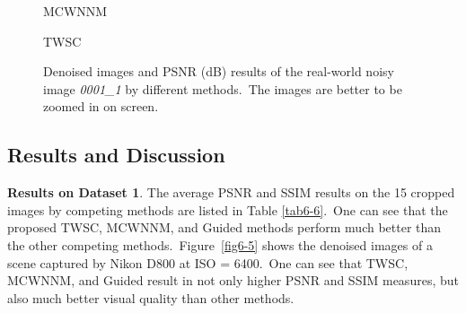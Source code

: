 \begin{figure}
{\begin{minipage}[t]{0.19\textwidth}
{\scriptsize MCWNNM}
\end{minipage}
\begin{minipage}[t]{0.19\textwidth}
\centering
{}
{\footnotesize TWSC}
\end{minipage}
}
    \caption{Denoised images and PSNR (dB) results of the real-world noisy image \textsl{0001\_1} \cite{dnd2017} by different methods.\ The images are better to be zoomed in on screen.}
    \label{fig6-6}
\end{figure}


\subsection{Results and Discussion}

\textbf{Results on Dataset 1}. The average PSNR and SSIM results on the 15 cropped images by competing methods are listed in Table \ref{tab6-6}.\ One can see that the proposed TWSC, MCWNNM, and Guided methods perform much better than the other competing methods.\ Figure\ \ref{fig6-5} shows the denoised images of a scene captured by Nikon D800 at ISO = 6400.\ One can see that TWSC, MCWNNM, and Guided result in not only higher PSNR and SSIM measures, but also much better visual quality than other methods.

